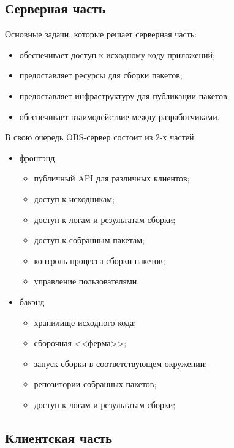 \documentclass[10pt, a5paper]{article}
\begin{document}
\subsection*{Серверная часть}

Основные задачи, которые решает серверная часть:

\begin{itemize}
  \item обеспечивает доступ к исходному коду приложений;
  \item предоставляет ресурсы для сборки пакетов;
  \item предоставляет инфраструктуру для публикации пакетов;
  \item обеспечивает взаимодействие между разработчиками.
\end{itemize}

В свою очередь OBS-сервер состоит из 2-х частей:

\begin{itemize}
  \item фронтэнд\begin{itemize}
  \item публичный API для различных клиентов;
  \item доступ к исходникам;
  \item доступ к логам и результатам сборки;
  \item доступ к собранным пакетам;
  \item контроль процесса сборки пакетов;
  \item управление пользователями.
\end{itemize}


  \item бакэнд\begin{itemize}
  \item хранилище исходного кода;
  \item сборочная <<ферма>>;
  \item запуск сборки в соответствующем окружении;
  \item репозитории собранных пакетов;
  \item доступ к логам и результатам сборки;
\end{itemize}


\end{itemize}

\subsection*{Клиентская часть}
\end{document}
